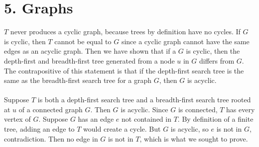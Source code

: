 \documentclass{article}
\begin{document}
\section*{5. Graphs}
$T$ never produces a cyclic graph, because trees by definition have no cycles.
If $G$ is cyclic, then $T$ cannot be equal to $G$ since a cyclic graph cannot
have the same edges as an acyclic graph. Then we have shown that if a $G$ is
cyclic, then the depth-first and breadth-first tree generated from a node $u$
in $G$ differs from $G$. The contrapositive of this statement is that if the
depth-first search tree is the same as the breadth-first search tree for a
graph $G$, then $G$ is acyclic.
\\\\
Suppose $T$ is both a depth-first search tree and a breadth-first search tree
rooted at $u$ of a connected graph $G$. Then $G$ is acyclic. Since $G$ is
connected, $T$ has every vertex of $G$. Suppose $G$ has an edge $e$ not
contained in $T$. By definition of a finite tree, adding an edge to $T$
would create a cycle. But $G$ is acyclic, so $e$ is not in $G$, contradiction.
Then no edge in $G$ is not in $T$, which is what we sought to prove.
\end{document}
